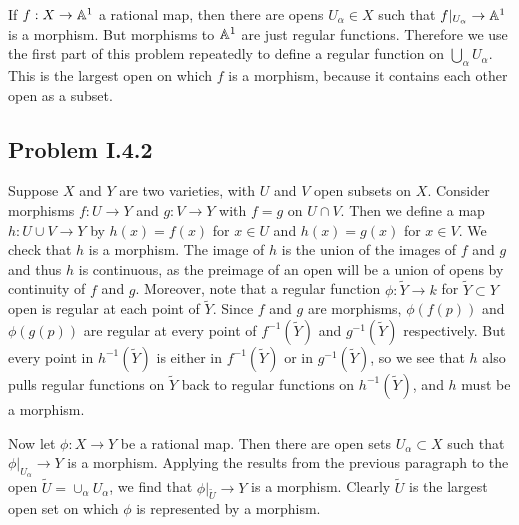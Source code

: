 \documentclass{mathnotes}
\begin{document}
If $f:X \to \mathbb{A}^1$ a rational map, then there are opens $U_{\alpha} \in X$ such that 
$f|_{U_{\alpha}} \to \mathbb{A}^1$ is a morphism. But morphisms to $\mathbb{A}^1$ are just regular functions. 
Therefore we use the first part of this problem repeatedly to define a regular function on 
$\bigcup_{\alpha} U_{\alpha}$. This is the largest open on which $f$ is a morphism, because 
it contains each other open as a subset.

\subsection*{Problem I.4.2}
Suppose $X$ and $Y$ are two varieties, with $U$ and $V$ open subsets on $X$. Consider morphisms
$f:U\to Y$ and $g:V\to Y$ with $f=g$ on $U\cap V$. Then we define a map $h:U\cup V\to Y$ by
$h(x)=f(x)$ for $x\in U$ and $h(x)=g(x)$ for $x\in V$. We check that $h$ is a morphism.
The image of $h$ is the union of the images of
$f$ and $g$ and thus $h$ is continuous, as the preimage of an open will be a union of opens by
continuity of $f$ and $g$. Moreover, note that a regular function $\phi:\tilde Y\to k$ for $\tilde Y\subset Y$
open is regular at each point of $\tilde Y$. Since $f$ and $g$ are morphisms, $\phi(f(p))$ 
and $\phi(g(p))$ are regular at every point of $f^{-1}(\tilde Y)$ and $g^{-1}(\tilde Y)$ respectively. But every point in $h^{-1}(\tilde Y)$
is either in $f^{-1}(\tilde Y)$ or in $g^{-1}(\tilde Y)$, so we see that $h$ also pulls regular functions on 
$\tilde Y$ back to regular functions on $h^{-1}(\tilde Y)$, and $h$ must be a morphism.

Now let $\phi:X\to Y$ be a rational map. Then there are open sets $U_\alpha\subset X$ such that
$\phi|_{U_\alpha}\to Y$ is a morphism. Applying the results from the previous paragraph to the open
$\tilde U=\cup_\alpha U_\alpha$, we find that $\phi|_{\tilde U}\to Y$ is a morphism. Clearly
$\tilde U$ is the largest open set on which $\phi$ is represented by a morphism.
\end{document}
